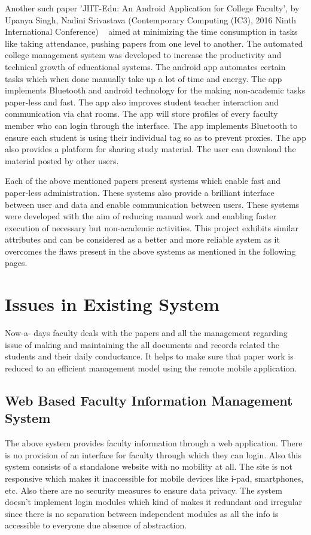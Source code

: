 \documentclass[BTech]{srmuthesis}
\begin{document}
Another such paper 'JIIT-Edu: An Android Application for College Faculty', by Upanya Singh,
Nadini Srivastava (Contemporary Computing (IC3), 2016 Ninth International Conference)  
aimed at minimizing the time consumption in tasks like taking attendance, pushing papers from
one level to another. The automated college management system was developed to increase
the productivity and technical growth of educational systems. The android app automates
certain tasks which when done manually take up a lot of time and energy. The app implements
Bluetooth and android technology for the making non-academic tasks paper-less and fast. The
app also improves student teacher interaction and communication via chat rooms. The app will
store profiles of every faculty member who can login through the interface. The app
implements Bluetooth to ensure each student is using their individual tag so as to prevent
proxies. The app also provides a platform for sharing study material. The user can download the material posted by other users.

Each of the above mentioned papers present systems which enable fast and paper-less
administration. These systems also provide a brilliant interface between user and data and
enable communication between users. These systems were developed with the aim of reducing manual work and enabling faster execution of necessary but non-academic activities. This project exhibits similar attributes and can be considered as a better and more reliable system as it overcomes the flaws present in the above systems as mentioned in the following pages.
\section{Issues in Existing System}
Now-a- days faculty deals with the papers and all the management regarding issue of making and
maintaining the all documents and records related the students and their daily conductance. It helps to
make sure that paper work is reduced to an efficient management model using the remote mobile
application.

\subsection{Web Based Faculty Information Management System}
The above system provides faculty information through a web application. There is no provision
of an interface for faculty through which they can login. Also this system consists of a
standalone website with no mobility at all. The site is not responsive which makes it
inaccessible for mobile devices like i-pad, smartphones, etc. Also there are no security
measures to ensure data privacy. The system doesn't implement login modules which kind of
makes it redundant and irregular since there is no separation between independent modules as
all the info is accessible to everyone due absence of abstraction.
\end{document}
